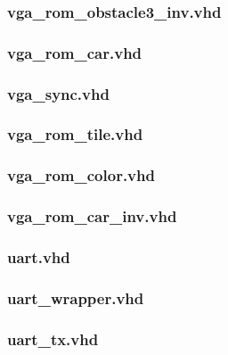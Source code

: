 \subsubsection*{vga\_rom\_obstacle3\_inv.vhd}


\subsubsection*{vga\_rom\_car.vhd}


\subsubsection*{vga\_sync.vhd}


\subsubsection*{vga\_rom\_tile.vhd}


\subsubsection*{vga\_rom\_color.vhd}


\subsubsection*{vga\_rom\_car\_inv.vhd}


\subsubsection*{uart.vhd}


\subsubsection*{uart\_wrapper.vhd}


\subsubsection*{uart\_tx.vhd}


